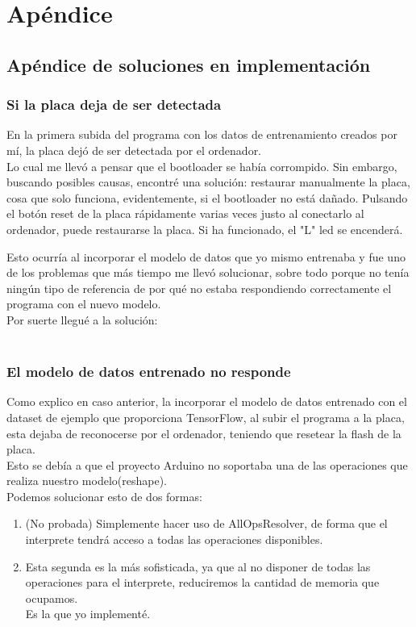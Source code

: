 \chapter{Apéndice}

\section{Apéndice de soluciones en implementación}

\subsection{Si la placa deja de ser detectada}
En la primera subida del programa con los datos de entrenamiento
creados por mí, la placa dejó de ser detectada por el ordenador.\\
Lo cual me llevó a pensar que el bootloader se había corrompido.
Sin embargo, buscando posibles causas, encontré una solución:
restaurar manualmente la placa, cosa que solo funciona, evidentemente,
si el bootloader no está dañado.
Pulsando el botón reset de la placa rápidamente varias veces justo
al conectarlo al ordenador, puede restaurarse la placa. Si ha funcionado,
el "L" led se encenderá.

Esto ocurría al incorporar el modelo de datos que yo mismo entrenaba
y fue uno de los problemas que más tiempo me llevó solucionar, sobre
todo porque no tenía ningún tipo de referencia de por qué no estaba
respondiendo correctamente el programa con el nuevo modelo.\\
Por suerte llegué a la solución:\\~\\


\subsection{El modelo de datos entrenado no responde\cite{intro-tensor-micro}}
Como explico en caso anterior, la incorporar el modelo de datos
entrenado con el dataset de ejemplo que proporciona TensorFlow,
al subir el programa a la placa, esta dejaba de reconocerse por
el ordenador, teniendo que resetear la flash de la placa.\\
Esto se debía a que el proyecto Arduino no soportaba una de las
operaciones que realiza nuestro modelo(reshape).\\
\newpage Podemos solucionar esto de dos formas:
\begin{enumerate}
    \item (No probada) Simplemente hacer uso de AllOpsResolver,
    de forma que el interprete tendrá acceso a todas las operaciones
    disponibles.
    \item Esta segunda es la más sofisticada, ya que al no disponer
    de todas las operaciones para el interprete, reduciremos la cantidad
    de memoria que ocupamos.\\Es la que yo implementé.
\end{enumerate}


